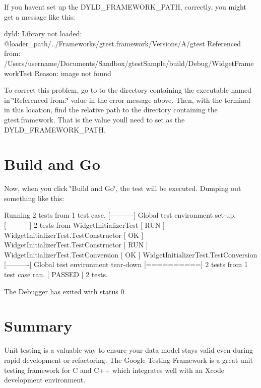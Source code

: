 If you haven\textquotesingle{}t set up the D\+Y\+L\+D\+\_\+\+F\+R\+A\+M\+E\+W\+O\+R\+K\+\_\+\+P\+A\+TH, correctly, you might get a message like this\+:


\begin{DoxyCode}
  dyld: Library not loaded: @loader\_path/../Frameworks/gtest.framework/Versions/A/gtest
    Referenced from: /Users/username/Documents/Sandbox/gtestSample/build/Debug/WidgetFrameworkTest
    Reason: image not found
\end{DoxyCode}


To correct this problem, go to to the directory containing the executable named in \char`\"{}\+Referenced from\+:\char`\"{} value in the error message above. Then, with the terminal in this location, find the relative path to the directory containing the gtest.\+framework. That is the value you\textquotesingle{}ll need to set as the D\+Y\+L\+D\+\_\+\+F\+R\+A\+M\+E\+W\+O\+R\+K\+\_\+\+P\+A\+TH.

\section*{Build and Go}

Now, when you click \char`\"{}\+Build and Go\char`\"{}, the test will be executed. Dumping out something like this\+:


\begin{DoxyCode}
 Running 2 tests from 1 test case.
[----------] Global test environment set-up.
[----------] 2 tests from WidgetInitializerTest
[ RUN      ] WidgetInitializerTest.TestConstructor
[       OK ] WidgetInitializerTest.TestConstructor
[ RUN      ] WidgetInitializerTest.TestConversion
[       OK ] WidgetInitializerTest.TestConversion
[----------] Global test environment tear-down
[==========] 2 tests from 1 test case ran.
[  PASSED  ] 2 tests.

The Debugger has exited with status 0.  
\end{DoxyCode}


\section*{Summary}

Unit testing is a valuable way to ensure your data model stays valid even during rapid development or refactoring. The Google Testing Framework is a great unit testing framework for C and C++ which integrates well with an Xcode development environment. 